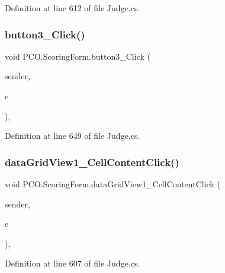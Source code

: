 Definition at line 612 of file Judge.\+cs.

\mbox{\label{classPCO_1_1ScoringForm_ab1391bf3c43520090b60708cbee00ce5}} 
\subsubsection{\texorpdfstring{button3\+\_\+\+Click()}{button3\_Click()}}
{\footnotesize\ttfamily void P\+C\+O.\+Scoring\+Form.\+button3\+\_\+\+Click (\begin{DoxyParamCaption}\item[{object}]{sender,  }\item[{Event\+Args}]{e }\end{DoxyParamCaption})\hspace{0.3cm}{\ttfamily [inline]}, {\ttfamily [private]}}



Definition at line 649 of file Judge.\+cs.

\mbox{\label{classPCO_1_1ScoringForm_a88a4a4a71557c77b88e570f2fd2285e1}} 
\subsubsection{\texorpdfstring{data\+Grid\+View1\+\_\+\+Cell\+Content\+Click()}{dataGridView1\_CellContentClick()}}
{\footnotesize\ttfamily void P\+C\+O.\+Scoring\+Form.\+data\+Grid\+View1\+\_\+\+Cell\+Content\+Click (\begin{DoxyParamCaption}\item[{object}]{sender,  }\item[{Data\+Grid\+View\+Cell\+Event\+Args}]{e }\end{DoxyParamCaption})\hspace{0.3cm}{\ttfamily [inline]}, {\ttfamily [private]}}



Definition at line 607 of file Judge.\+cs.

